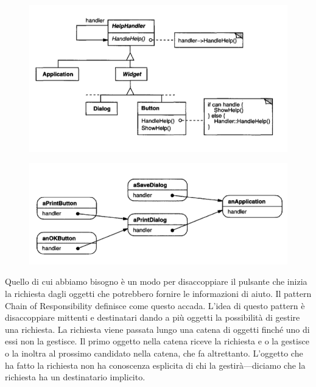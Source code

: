 \begin{multicols}{2}
    \begin{figure}[H]
        \centering
        \includegraphics[width=1\linewidth]{assets/pattern/chain-of-responsability/cor-esempio-class.png}
    \end{figure}
    \columnbreak
    \begin{figure}[H]
        \centering
        \includegraphics[width=1\linewidth]{assets/pattern/chain-of-responsability/cor-esempio-object.png}
    \end{figure}
\end{multicols}

Quello di cui abbiamo bisogno è un modo per disaccoppiare il pulsante che inizia la richiesta dagli oggetti che potrebbero fornire le informazioni di aiuto. Il pattern Chain of Responsibility definisce come questo accada. L'idea di questo pattern è disaccoppiare mittenti e destinatari dando a più oggetti la possibilità di gestire una richiesta. La richiesta viene passata lungo una catena di oggetti finché uno di essi non la gestisce. Il primo oggetto nella catena riceve la richiesta e o la gestisce o la inoltra al prossimo candidato nella catena, che fa altrettanto. L'oggetto che ha fatto la richiesta non ha conoscenza esplicita di chi la gestirà—diciamo che la richiesta ha un destinatario implicito.

